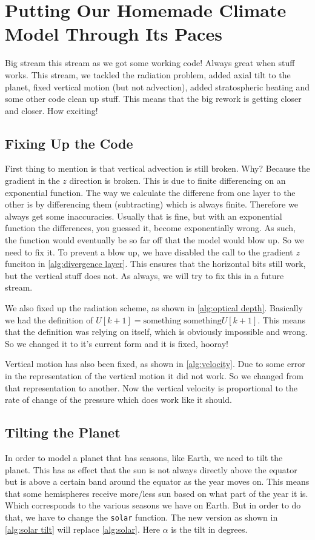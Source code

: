 \section{Putting Our Homemade Climate Model Through Its Paces}
Big stream this stream as we got some working code! Always great when stuff works. This stream, we tackled the radiation problem, added axial tilt to the planet, fixed vertical motion (but not
advection), added stratospheric heating and some other code clean up stuff. This means that the big rework is getting closer and closer. How exciting!

\subsection{Fixing Up the Code}
First thing to mention is that vertical advection is still broken. Why? Because the gradient in the $z$ direction is broken. This is due to finite differencing on an exponential function. The way
we calculate the differenc from one layer to the other is by differencing them (subtracting) which is always finite. Therefore we always get some inaccuracies. Usually that is fine, but with an 
exponential function the differences, you guessed it, become exponentially wrong. As such, the function would eventually be so far off that the model would blow up. So we need to fix it. To 
prevent a blow up, we have disabled the call to the gradient $z$ funciton in \autoref{alg:divergence layer}. This ensures that the horizontal bits still work, but the vertical stuff does not.
As always, we will try to fix this in a future stream. 

We also fixed up the radiation scheme, as shown in \autoref{alg:optical depth}. Basically we had the definition of $U[k + 1] = \text{something something} U[k + 1]$. This means that the definition
was relying on itself, which is obviously impossible and wrong. So we changed it to it's current form and it is fixed, hooray!

Vertical motion has also been fixed, as shown in \autoref{alg:velocity}. Due to some error in the representation of the vertical motion it did not work. So we changed from that representation to 
another. Now the vertical velocity is proportional to the rate of change of the pressure which does work like it should.

\subsection{Tilting the Planet}
In order to model a planet that has seasons, like Earth, we need to tilt the planet. This has as effect that the sun is not always directly above the equator but is above a certain band around
the equator as the year moves on. This means that some hemispheres receive more/less sun based on what part of the year it is. Which corresponds to the various seasons we have on Earth. But in
order to do that, we have to change the \texttt{solar} function. The new version as shown in \autoref{alg:solar tilt} will replace \autoref{alg:solar}. Here $\alpha$ is the tilt in degrees.


